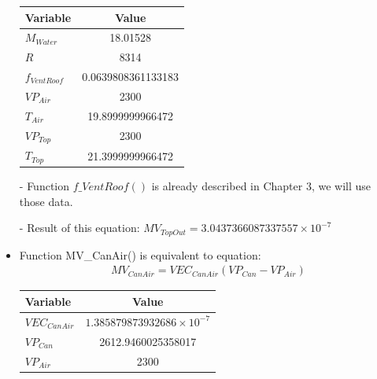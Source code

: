 \documentclass[a4paper]{article}
\numberwithin{equation}{section}
\begin{document}
\begin{itemize}
        \begin{table}[H]
          \centering
          \begin{tabular}{@{}lS[table-format=4.17]@{}}
            \toprule
            \textbf{Variable} & \textbf{Value}     \\
            \midrule
            \(M_{Water}\)     & 18.01528           \\
            \(R\)             & 8314               \\
            \(f_{VentRoof}\)  & 0.0639808361133183 \\
            \(VP_{Air}\)      & 2300               \\
            \(T_{Air}\)       & 19.8999999966472   \\
            \(VP_{Top}\)      & 2300               \\
            \(T_{Top}\)       & 21.3999999966472   \\
            \bottomrule
          \end{tabular}
        \end{table}
  \item [-] Function \hyperref[fVentRoof]{\underline{\(f\_VentRoof()\)}} is already described in Chapter 3, we will use those data.
  \item[-] Result of this equation: \(MV_{TopOut} = 3.0437366087337557 \times 10^{-7} \)

  \item Function MV\_CanAir() is equivalent to equation:
        \begin{align*}
          MV_{CanAir} = VEC_{CanAir}(VP_{Can} - VP_{Air})
        \end{align*}

        \begin{table}[H]
          \centering
          \begin{tabular}{@{}lS[table-format=4.20]@{}}
            \toprule
            \textbf{Variable} & \textbf{Value}                       \\
            \midrule
            \(VEC_{CanAir}\)  & \(1.385879873932686 \times 10^{-7}\) \\
            \(VP_{Can}\)      & 2612.9460025358017                   \\
            \(VP_{Air}\)      & 2300                                 \\
            \bottomrule
          \end{tabular}
        \end{table}


\end{itemize}
\end{document}
